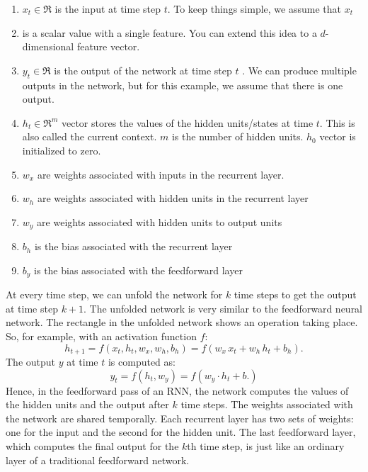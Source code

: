 \documentclass[10pt,a4paper]{article}
\begin{document}
\begin{enumerate}
\item $x_{t} \in \Re$ is the input at time step $t$. To keep things simple, we assume that $x_{t}$
\item is a scalar value with a single feature. You can extend this idea to a $d$-dimensional feature vector.
\item $y_{t} \in \Re$ is the output of the network at time step $t$ 
. We can produce multiple outputs in the network, but for this example, we assume that there is one output.
\item $h_{t} \in \Re^{m}$ vector stores the values of the hidden units/states at time $t$. This is also called the current context. $m$ is the number of hidden units. $h_{0}$ vector is initialized to zero.
\item $w_{x}$ are weights associated with inputs in the recurrent layer.
\item $w_{h}$ are weights associated with hidden units in the recurrent layer
\item $w_{y}$ are weights associated with hidden units to output units
\item $b_{h}$ is the bias associated with the recurrent layer
\item $b_{y}$ is the bias associated with the feedforward layer	
\end{enumerate}

At every time step, we can unfold the network for $k$
time steps to get the output at time step $k+1$. The unfolded network is very similar to the feedforward neural network. The rectangle in the unfolded network shows an operation taking place. So, for example, with an activation function $f$:
\begin{equation}
	h_{t+1} = f(x_{t}, h_{t}, w_{x}, w_{h}, b_{h}) = f(w_{x} \, x_{t} + w_{h} \, h_{t} + b_{h}).
\end{equation}
The output $y$ at time $t$ is computed as:
\begin{equation}
	y_{t} = f(h_{t}, w_{y}) = f(w_{y} \cdot h_{t} + b.)
\end{equation}
Hence, in the feedforward pass of an RNN, the network computes the values of the hidden units and the output after $k$
time steps. The weights associated with the network are shared temporally. Each recurrent layer has two sets of weights: one for the input and the second for the hidden unit. The last feedforward layer, which computes the final output for the $k$th time step, is just like an ordinary layer of a traditional feedforward network.
\end{document}

